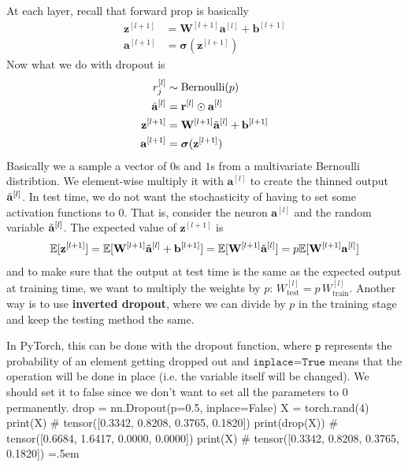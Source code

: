\documentclass{article}
\newenvironment{cverbatim}
 {\SaveVerbatim{cverb}}
 {\endSaveVerbatim
  \flushleft\fboxrule=0pt\fboxsep=.5em
  \colorbox{cverbbg}{%
    \makebox[\dimexpr\linewidth-2\fboxsep][l]{\BUseVerbatim{cverb}}%
  }
  \endflushleft
}
\theoremstyle{definition}
\theoremstyle{remark}
\theoremstyle{definition}
\begin{document}
At each layer, recall that forward prop is basically 
\begin{align*}
    \mathbf{z}^{[l+1]} & = \mathbf{W}^{[l+1]} \mathbf{a}^{[l]} + \mathbf{b}^{[l+1]} \\
    \mathbf{a}^{[l+1]} & = \boldsymbol{\sigma} (\mathbf{z}^{[l+1]}) 
\end{align*}
Now what we do with dropout is 
\begin{align*}
    r_j^{[l]} & \sim \mathrm{Bernoulli}(p) \\
    \Tilde{\mathbf{a}}^{[l]} & = \mathbf{r}^{[l]} \odot \mathbf{a}^{[l]} \\
    \mathbf{z}^{[l+1]} & = \mathbf{W}^{[l+1]} \Tilde{\mathbf{a}}^{[l]} + \mathbf{b}^{[l+1]} \\
    \mathbf{a}^{[l+1]} & = \boldsymbol{\sigma} (\mathbf{z}^{[l+1]}) 
\end{align*}
Basically we a sample a vector of $0$s and $1$s from a multivariate Bernoulli distribtion. We element-wise multiply it with $\mathbf{a}^{[l]}$ to create the thinned output $\Tilde{\mathbf{a}}^{[l]}$. In test time, we do not want the stochasticity of having to set some activation functions to $0$. That is, consider the neuron $\mathbf{a}^{[l]}$ and the random variable $\Tilde{\mathbf{a}}^{[l]}$. The expected value of $\mathbf{z}^{[l+1]}$ is 
\[\mathbb{E}[\mathbf{z}^{[l+1]}] = \mathbb{E}[ \mathbf{W}^{[l+1]} \Tilde{\mathbf{a}}^{[l]} + \mathbf{b}^{[l+1]}] = \mathbb{E}[ \mathbf{W}^{[l+1]} \Tilde{\mathbf{a}}^{[l]}] = p \mathbb{E}[\mathbf{W}^{[l+1]} \mathbf{a}^{[l]}] \]
and to make sure that the output at test time is the same as the expected output at training time, we want to multiply the weights by $p$: $W^{[l]}_{\text{test}} = p \, W^{[l]}_{\text{train}}$. Another way is to use \textbf{inverted dropout}, where we can divide by $p$ in the training stage and keep the testing method the same. 

In PyTorch, this can be done with the dropout function, where $\texttt{p}$ represents the probability of an element getting dropped out and $\texttt{inplace=True}$ means that the operation will be done in place (i.e. the variable itself will be changed). We should set it to false since we don't want to set all the parameters to $0$ permanently. 
\begin{cverbatim}
drop = nn.Dropout(p=0.5, inplace=False)
X = torch.rand(4) 
print(X)            # tensor([0.3342, 0.8208, 0.3765, 0.1820])
print(drop(X))      # tensor([0.6684, 1.6417, 0.0000, 0.0000])
print(X)            # tensor([0.3342, 0.8208, 0.3765, 0.1820])
\end{cverbatim}
\end{document}
